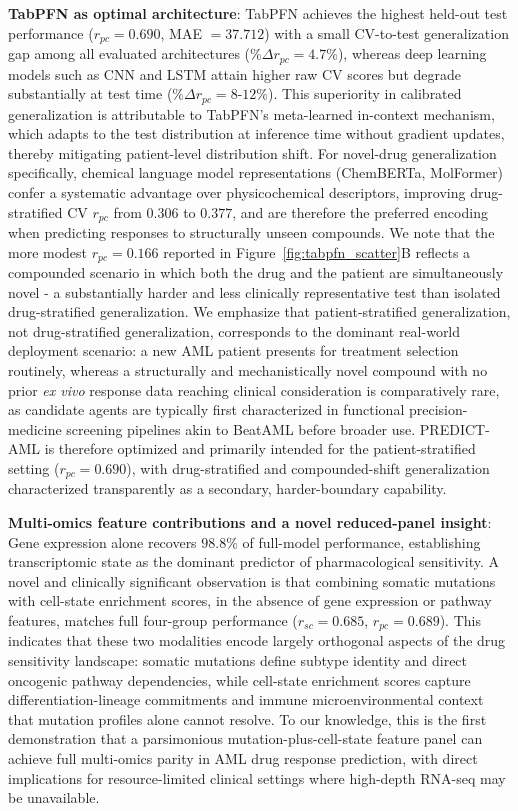 \documentclass[pdflatex,sn-mathphys-num]{sn-jnl}
\theoremstyle{thmstyleone}
\theoremstyle{thmstyletwo}
\theoremstyle{thmstylethree}
\begin{document}
\textbf{TabPFN as optimal architecture}: TabPFN \cite{hollmann2023tabpfn} achieves the highest held-out test performance ($r_{pc} = 0.690$, MAE $= 37.712$) with a small CV-to-test generalization gap among all evaluated architectures ($\%\Delta r_{pc} = 4.7\%$), whereas deep learning models such as CNN and LSTM attain higher raw CV scores but degrade substantially at test time ($\%\Delta r_{pc} = 8$-$12\%$). This superiority in calibrated generalization is attributable to TabPFN's meta-learned in-context mechanism, which adapts to the test distribution at inference time without gradient updates, thereby mitigating patient-level distribution shift. For novel-drug generalization specifically, chemical language model representations (ChemBERTa, MolFormer) confer a systematic advantage over physicochemical descriptors, improving drug-stratified CV $r_{pc}$ from $0.306$ to $0.377$, and are therefore the preferred encoding when predicting responses to structurally unseen compounds. We note that the more modest $r_{pc} = 0.166$ reported in Figure~\ref{fig:tabpfn_scatter}B reflects a compounded scenario in which both the drug and the patient are simultaneously novel - a substantially harder and less clinically representative test than isolated drug-stratified generalization. We emphasize that patient-stratified generalization, not drug-stratified generalization, corresponds to the dominant real-world deployment scenario: a new AML patient presents for treatment selection routinely, whereas a structurally and mechanistically novel compound with no prior \textit{ex vivo} response data reaching clinical consideration is comparatively rare, as candidate agents are typically first characterized in functional precision-medicine screening pipelines akin to BeatAML before broader use. PREDICT-AML is therefore optimized and primarily intended for the patient-stratified setting ($r_{pc} = 0.690$), with drug-stratified and compounded-shift generalization characterized transparently as a secondary, harder-boundary capability.

\textbf{Multi-omics feature contributions and a novel reduced-panel insight}: Gene expression alone recovers $98.8\%$ of full-model performance, establishing transcriptomic state as the dominant predictor of pharmacological sensitivity. A novel and clinically significant observation is that combining somatic mutations with cell-state enrichment scores, in the absence of gene expression or pathway features, matches full four-group performance ($r_{sc} = 0.685$, $r_{pc} = 0.689$). This indicates that these two modalities encode largely orthogonal aspects of the drug sensitivity landscape: somatic mutations define subtype identity and direct oncogenic pathway dependencies, while cell-state enrichment scores capture differentiation-lineage commitments and immune microenvironmental context that mutation profiles alone cannot resolve. To our knowledge, this is the first demonstration that a parsimonious mutation-plus-cell-state feature panel can achieve full multi-omics parity in AML drug response prediction, with direct implications for resource-limited clinical settings where high-depth RNA-seq may be unavailable.
\end{document}
